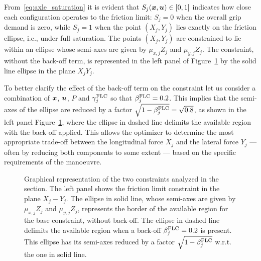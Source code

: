 From~\eqref{eq:axle_saturation} it is evident that $S_j(\boldsymbol{x},\boldsymbol{u})\in [0,1]$ indicates how close each configuration operates to the friction limit: $S_j=0$ when the overall grip demand is zero, while $S_j = 1$ when the point $\left(X_j, Y_j\right)$ lies exactly on the friction ellipse, i.e., under full saturation.
The points $\left(X_j,Y_j\right)$ are constrained to lie within an ellipse whose semi-axes are given by $\mu_{x,j}Z_j$ and $\mu_{y,j}Z_j$. The constraint, without the back-off term, is represented in the left panel of Figure~\ref{fig:robust_constraints} by the solid line ellipse in the plane $X_jY_j$.

To better clarify the effect of the back-off term on the constraint let us consider a combination of $\boldsymbol{x}$, $\boldsymbol{u}$, $P$ and $\gamma^\textrm{FLC}_j$ so that $\beta^\textrm{FLC}_j=0.2$. This implies that the semi-axes of the ellipse are reduced by a factor $\sqrt{1-\beta^\textrm{FLC}_j} = \sqrt{0.8}$, as shown in the left panel Figure~\ref{fig:robust_constraints}, where the ellipse in dashed line delimits the available region with the back-off applied. This allows the optimizer to determine the most appropriate trade-off between the longitudinal force $X_j$ and the lateral force $Y_j$ --- often by reducing both components to some extent --- based on the specific requirements of the manoeuvre.


\begin{figure}
	\centering
	
	\hfill
	
	\caption{Graphical representation of the two constraints analyzed in the section. The left panel shows the friction limit constraint in the plane $X_j-Y_j$. The ellipse in solid line, whose semi-axes are given by $\mu_{x,j}Z_j$ and $\mu_{y,j}Z_j$, represents the border of the available region for the base constraint, without back-off. The ellipse in dashed line delimits the available region when a back-off $\beta^\textrm{FLC}_j=0.2$ is present. This ellipse has its semi-axes reduced by a factor $\sqrt{1-\beta^\textrm{FLC}_j}$ w.r.t. the one in solid line.
	}
	\label{fig:robust_constraints}
\end{figure}

